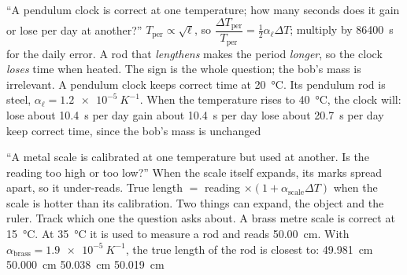 {``A pendulum clock is correct at one temperature; how many seconds does it gain or lose per day at
another?''}
{$T_{\text{per}}\propto\sqrt{\ell}$, so $\dfrac{\Delta T_{\text{per}}}{T_{\text{per}}}
=\tfrac12\alpha_\ell\Delta T$; multiply by \SI{86400}{s} for the daily error.}
{A rod that \emph{lengthens} makes the period \emph{longer}, so the clock \emph{loses} time when
heated. The sign is the whole question; the bob's mass is irrelevant.}
{A pendulum clock keeps correct time at \SI{20}{\celsius}. Its pendulum rod is steel,
$\alpha_\ell=\SI{1.2e-5}{K^{-1}}$. When the temperature rises to \SI{40}{\celsius}, the clock will:}
{lose about \SI{10.4}{s} per day}
{gain about \SI{10.4}{s} per day}
{lose about \SI{20.7}{s} per day}
{keep correct time, since the bob's mass is unchanged}

{``A metal scale is calibrated at one temperature but used at another. Is the reading too high or too
low?''}
{When the scale itself expands, its marks spread apart, so it under-reads. True length $=$
reading $\times(1+\alpha_{\text{scale}}\Delta T)$ when the scale is hotter than its calibration.}
{Two things can expand, the object and the ruler. Track which one the question asks about.}
{A brass metre scale is correct at \SI{15}{\celsius}. At \SI{35}{\celsius} it is used to measure a rod
and reads \SI{50.00}{cm}. With $\alpha_{\text{brass}}=\SI{1.9e-5}{K^{-1}}$, the true length of the rod
is closest to:}
{\SI{49.981}{cm}}
{\SI{50.000}{cm}}
{\SI{50.038}{cm}}
{\SI{50.019}{cm}}


